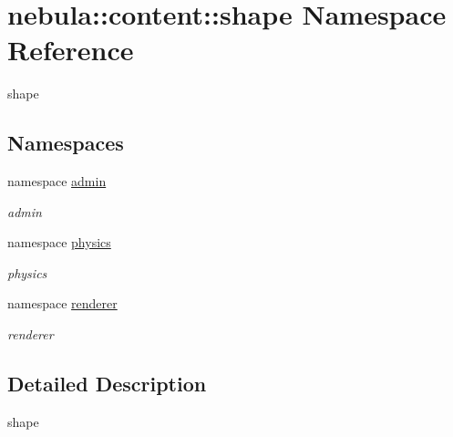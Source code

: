 \hypertarget{namespacenebula_1_1content_1_1shape}{
\section{nebula::content::shape Namespace Reference}
\label{namespacenebula_1_1content_1_1shape}
}


shape  
\subsection*{Namespaces}
\begin{DoxyCompactItemize}
\item 
namespace \hyperlink{namespacenebula_1_1content_1_1shape_1_1admin}{admin}


\begin{DoxyCompactList}\small\item\em admin \item\end{DoxyCompactList}\item 
namespace \hyperlink{namespacenebula_1_1content_1_1shape_1_1physics}{physics}


\begin{DoxyCompactList}\small\item\em physics \item\end{DoxyCompactList}\item 
namespace \hyperlink{namespacenebula_1_1content_1_1shape_1_1renderer}{renderer}


\begin{DoxyCompactList}\small\item\em renderer \item\end{DoxyCompactList}\end{DoxyCompactItemize}


\subsection{Detailed Description}
shape 